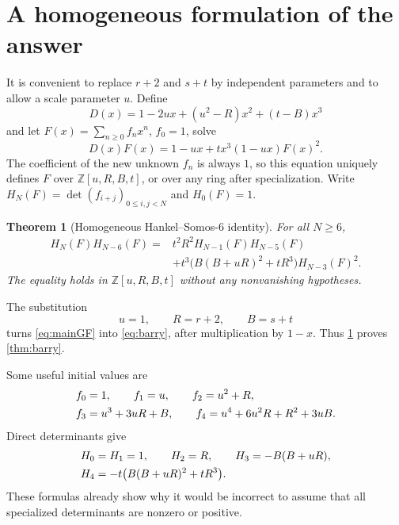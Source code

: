 \documentclass[11pt,a4paper]{article}
\numberwithin{equation}{section}
\newtheorem{theorem}{Theorem}[section]
\theoremstyle{definition}
\newcommand{\Z}{\mathbb Z}
\begin{document}
\section{A homogeneous formulation of the answer}

It is convenient to replace $r+2$ and $s+t$ by independent parameters and to
allow a scale parameter $u$. Define
\begin{equation}\label{eq:D}
 D(x)=1-2ux+(u^2-R)x^2+(t-B)x^3
\end{equation}
and let $F(x)=\sum_{n\geq0}f_nx^n$, $f_0=1$, solve
\begin{equation}\label{eq:mainGF}
 D(x)F(x)=1-ux+tx^3(1-ux)F(x)^2.
\end{equation}
The coefficient of the new unknown $f_n$ is always $1$, so this equation
uniquely defines $F$ over $\Z[u,R,B,t]$, or over any ring after specialization.
Write $H_N(F)=\det(f_{i+j})_{0\leq i,j<N}$ and $H_0(F)=1$.

\begin{theorem}[Homogeneous Hankel--Somos-6 identity]\label{thm:main}
For all $N\geq6$,
\begin{equation}\label{eq:mainrec}
 \begin{split}
 H_N(F)H_{N-6}(F)
 ={}&t^2R^2H_{N-1}(F)H_{N-5}(F)\\
 &+t^3\bigl(B(B+uR)^2+tR^3\bigr)H_{N-3}(F)^2.
 \end{split}
\end{equation}
The equality holds in $\Z[u,R,B,t]$ without any nonvanishing hypotheses.
\end{theorem}

The substitution
\begin{equation}\label{eq:originalspec}
 u=1,\qquad R=r+2,\qquad B=s+t
\end{equation}
turns \eqref{eq:mainGF} into \eqref{eq:barry}, after multiplication by $1-x$.
Thus \cref{thm:main} proves \cref{thm:barry}.

Some useful initial values are
\begin{align}
 f_0&=1,\qquad f_1=u,\qquad f_2=u^2+R,\notag\\
 f_3&=u^3+3uR+B,\qquad f_4=u^4+6u^2R+R^2+3uB.
\end{align}
Direct determinants give
\begin{align}\label{eq:initialH}
 H_0&=H_1=1,\qquad H_2=R,\qquad H_3=-B(B+uR),\\
 H_4&=-t\bigl(B(B+uR)^2+tR^3\bigr).\notag
\end{align}
These formulas already show why it would be incorrect to assume that all
specialized determinants are nonzero or positive.
\end{document}
